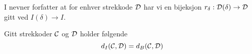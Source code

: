 \begin{bemerk}\label{bem:r_delta}
  I \citep[seksjon 4.2]{Bauer2020} nevner forfatter at for
  enhver strekkode $\mathcal{D}$ har vi en bijeksjon 
  $r_\delta:\mathcal{D}(\delta)\to\mathcal{D}$ gitt ved $I(\delta)\to
  I$.
\end{bemerk}

\begin{teorem}\label{trm:FA_lik_IA}
Gitt strekkoder $\mathcal{C}$ og $\mathcal{D}$ holder følgende
\[d_I(\mathcal{C},\mathcal{D}) = d_B(\mathcal{C},\mathcal{D})\]
\end{teorem}
